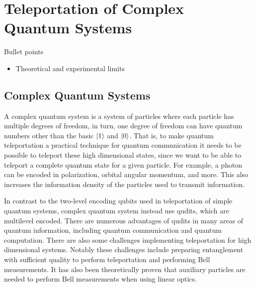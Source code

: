 \section{Teleportation of Complex Quantum Systems}
\begin{mybox}{Bullet points}
    \begin{itemize}
        \item Theoretical and experimental limits
    \end{itemize}
\end{mybox}

\subsection{Complex Quantum Systems}
A complex quantum system is a system of particles where each particle has multiple degrees of freedom, in turn, one degree of freedom can have quantum numbers other than the basic $\ket{1}$ and $\ket{0}$. That is, to make quantum teleportation a practical technique for quantum communication it needs to be possible to teleport these high dimensional states, since we want to be able to teleport a complete quantum state for a given particle. For example, a photon can be encoded in polarization, orbital angular momentum, and more. This also increases the information density of the particles used to transmit information. \cite{Hu:2023}

In contrast to the two-level encoding qubits used in teleportation of simple quantum systems, complex quantum system instead use qudits, which are multilevel encoded. There are numerous advantages of qudits in many areas of quantum information, including quantum communication and quantum computation. There are also some challenges implementing teleportation for high dimensional systems. Notably these challenges include preparing entanglement with sufficient quality to perform teleportation and performing Bell measurements. It has also been theoretically proven that auxiliary particles are needed to perform Bell measurements when using linear optics. \cite{Hu:2023}

